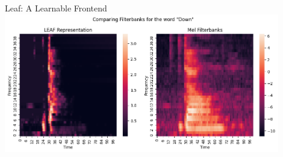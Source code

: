 




\begin{frame}{Leaf: A Learnable Frontend}
    \centering
    \includegraphics[height=0.7\textheight,width=0.9\textwidth,keepaspectratio]{images/leaf_demo.png}
\end{frame}
    
